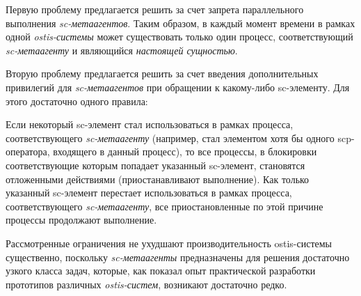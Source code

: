 \begin{SCn}
{Первую проблему предлагается решить за счет запрета параллельного выполнения \textit{sc-метаагентов}. Таким образом, в каждый момент времени в рамках одной \textit{ostis-системы} может существовать только один процесс, соответствующий \textit{sc-метаагенту} и являющийся \textit{настоящей сущностью}. 
	
Вторую проблему предлагается решить за счет введения дополнительных привилегий для \textit{sc-метаагентов} при обращении к какому-либо sc-элементу. Для этого достаточно одного правила: 

Если некоторый sc-элемент стал использоваться в рамках процесса, соответствующего \textit{sc-метаагенту} (например, стал элементом хотя бы одного scp-оператора, входящего в данный процесс), то все процессы, в блокировки соответствующие которым попадает указанный sc-элемент, становятся отложенными действиями (приостанавливают выполнение). Как только указанный sc-элемент перестает использоваться в рамках процесса, соответствующего \textit{sc-метаагенту}, все приостановленные по этой причине процессы продолжают выполнение.
	
Рассмотренные ограничения не ухудшают производительность ostis-системы существенно, поскольку \textit{sc-метаагенты} предназначены для решения достаточно узкого класса задач, которые, как показал опыт практической разработки прототипов различных \textit{ostis-систем}, возникают достаточно редко.}

\bigskip
\scnendstruct

\bigskip
\scnendstruct \scnendcurrentsectioncomment

\end{SCn}